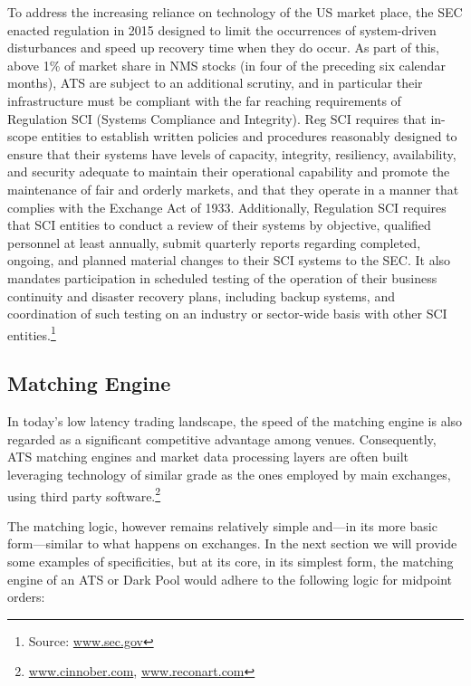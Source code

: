 To address the increasing reliance on technology of the US market place, the SEC enacted regulation in 2015 designed to limit the occurrences of system-driven disturbances and speed up recovery time when they do occur. As part of this, above 1\% of market share in NMS stocks (in four of the preceding six calendar months), ATS are subject to an additional scrutiny, and in particular their infrastructure must be compliant with the far reaching requirements of Regulation SCI (Systems Compliance and Integrity). Reg SCI requires that in-scope entities to establish written policies and procedures reasonably designed to ensure that their systems have levels of capacity, integrity, resiliency, availability, and security adequate to maintain their operational capability and promote the maintenance of fair and orderly markets, and that they operate in a manner that complies with the Exchange Act of 1933. Additionally, Regulation SCI requires that SCI entities to conduct a review of their systems by objective, qualified personnel at least annually, submit quarterly reports regarding completed, ongoing, and planned material changes to their SCI systems to the SEC. It also mandates participation in scheduled testing of the operation of their business continuity and disaster recovery plans, including backup systems, and coordination of such testing on an industry or sector-wide basis with other SCI entities.\footnote{Source: \url{www.sec.gov}}



\subsection{Matching Engine\label{sec:match_engine}}

In today's low latency trading landscape, the speed of the matching engine is also regarded as a significant competitive advantage among venues. Consequently, ATS  matching engines and market data processing layers are often built leveraging technology of similar grade as the ones employed by main exchanges, using third party software.\footnote{\url{www.cinnober.com}, \url{www.reconart.com}}


The matching logic, however remains relatively simple and---in its more basic form---similar to what happens on exchanges. In the next section we will provide some examples of specificities, but at its core, in its simplest form, the matching engine of an ATS or Dark Pool would adhere to the following logic for midpoint orders: \twomedskip


